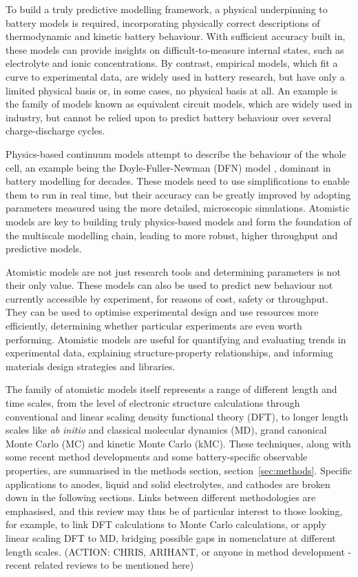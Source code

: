 \documentclass[../main.tex]{subfiles}
\begin{document}
To build a truly predictive modelling framework, a physical underpinning to battery models is required, incorporating physically correct descriptions of thermodynamic and kinetic battery behaviour. With sufficient accuracy built in, these models can provide insights on difficult-to-measure internal states, such as electrolyte and ionic concentrations. By contrast, empirical models, which fit a curve to experimental data, are widely used in battery research, but have only a limited physical basis or, in some cases, no physical basis at all. An example is the family of models known as equivalent circuit models, which are widely used in industry, but cannot be relied upon to predict battery behaviour over several charge-discharge cycles.

Physics-based continuum models attempt to describe the behaviour of the whole cell, an example being the Doyle-Fuller-Newman (DFN) model \cite{Newman1975}, dominant in battery modelling for decades. These models need to use simplifications to enable them to run in real time, but their accuracy can be greatly improved by adopting parameters measured using the more detailed, microscopic simulations. Atomistic models are key to building truly physics-based models and form the foundation of the multiscale modelling chain, leading to more robust, higher throughput and predictive models.
 
Atomistic models are not just research tools and determining parameters is not their only value. These models can also be used to predict new behaviour not currently accessible by experiment, for reasons of cost, safety or throughput. They can be used to optimise experimental design and use resources more efficiently, determining whether particular experiments are even worth performing. Atomistic models are useful for quantifying and evaluating trends in experimental data, explaining structure-property relationships, and informing materials design strategies and libraries.

The family of atomistic models itself represents a range of different length and time scales, from the level of electronic structure calculations through conventional and linear scaling density functional theory (DFT), to longer length scales like \textit{ab initio} and classical molecular dynamics (MD), grand canonical Monte Carlo (MC) and kinetic Monte Carlo (kMC). These techniques, along with some recent method developments and some battery-specific observable properties, are summarised in the methods section, section~\ref{sec:methods}. Specific applications to anodes, liquid and solid electrolytes, and cathodes are broken down in the following sections. Links between different methodologies are emphasised, and this review may thus be of particular interest to those looking, for example, to link DFT calculations to Monte Carlo calculations, or apply linear scaling DFT to MD, bridging possible gaps in nomenclature at different length scales. (ACTION: CHRIS, ARIHANT, or anyone in method development - recent related reviews to be mentioned here)
\end{document}
